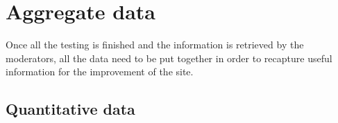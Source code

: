 \begin{center}
\vfill
\newpage
\null
\vfill
{}
\vfill
\newpage
\end{center}


\section{Aggregate data}
Once all the testing is finished and the information is retrieved by the moderators, all the data need to be put together in order to recapture useful information for the improvement of the site.

\subsection{Quantitative data}

